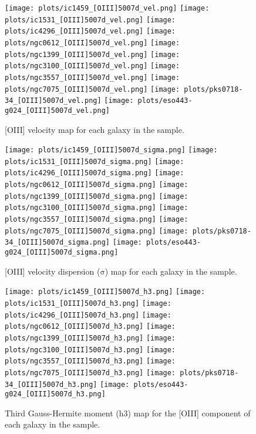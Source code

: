 \documentclass[fleqn,usenatbib,useAMS]{mnras}
\begin{document}
		\begin{figure*}
			\centering
			\texttt{[image: plots/ic1459\_[OIII]5007d\_vel.png]}
			\texttt{[image: plots/ic1531\_[OIII]5007d\_vel.png]}
			\texttt{[image: plots/ic4296\_[OIII]5007d\_vel.png]}
			\texttt{[image: plots/ngc0612\_[OIII]5007d\_vel.png]}
			\texttt{[image: plots/ngc1399\_[OIII]5007d\_vel.png]}
			\texttt{[image: plots/ngc3100\_[OIII]5007d\_vel.png]}
			\texttt{[image: plots/ngc3557\_[OIII]5007d\_vel.png]}
			\texttt{[image: plots/ngc7075\_[OIII]5007d\_vel.png]}
			\texttt{[image: plots/pks0718-34\_[OIII]5007d\_vel.png]}
			\texttt{[image: plots/eso443-g024\_[OIII]5007d\_vel.png]}
			\caption{[OIII] velocity map for each galaxy in the sample.}
			\label{fig:OIII_vel}
		\end{figure*}

		\begin{figure*}
			\centering
			\texttt{[image: plots/ic1459\_[OIII]5007d\_sigma.png]}
			\texttt{[image: plots/ic1531\_[OIII]5007d\_sigma.png]}
			\texttt{[image: plots/ic4296\_[OIII]5007d\_sigma.png]}
			\texttt{[image: plots/ngc0612\_[OIII]5007d\_sigma.png]}
			\texttt{[image: plots/ngc1399\_[OIII]5007d\_sigma.png]}
			\texttt{[image: plots/ngc3100\_[OIII]5007d\_sigma.png]}
			\texttt{[image: plots/ngc3557\_[OIII]5007d\_sigma.png]}
			\texttt{[image: plots/ngc7075\_[OIII]5007d\_sigma.png]}
			\texttt{[image: plots/pks0718-34\_[OIII]5007d\_sigma.png]}
			\texttt{[image: plots/eso443-g024\_[OIII]5007d\_sigma.png]}
			\caption{[OIII] velocity dispersion ($\mathrm{\sigma}$) map for each galaxy in the sample.}
			\label{fig:OIII_sigma}
		\end{figure*}


		\begin{figure*}
			\centering
			\texttt{[image: plots/ic1459\_[OIII]5007d\_h3.png]}
			\texttt{[image: plots/ic1531\_[OIII]5007d\_h3.png]}
			\texttt{[image: plots/ic4296\_[OIII]5007d\_h3.png]}
			\texttt{[image: plots/ngc0612\_[OIII]5007d\_h3.png]}
			\texttt{[image: plots/ngc1399\_[OIII]5007d\_h3.png]}
			\texttt{[image: plots/ngc3100\_[OIII]5007d\_h3.png]}
			\texttt{[image: plots/ngc3557\_[OIII]5007d\_h3.png]}
			\texttt{[image: plots/ngc7075\_[OIII]5007d\_h3.png]}
			\texttt{[image: plots/pks0718-34\_[OIII]5007d\_h3.png]}
			\texttt{[image: plots/eso443-g024\_[OIII]5007d\_h3.png]}
			\caption{Third Gauss-Hermite moment (h3) map for the [OIII] component of each galaxy in the sample.}
			\label{fig:OIII_h3}
		\end{figure*}
\end{document}
